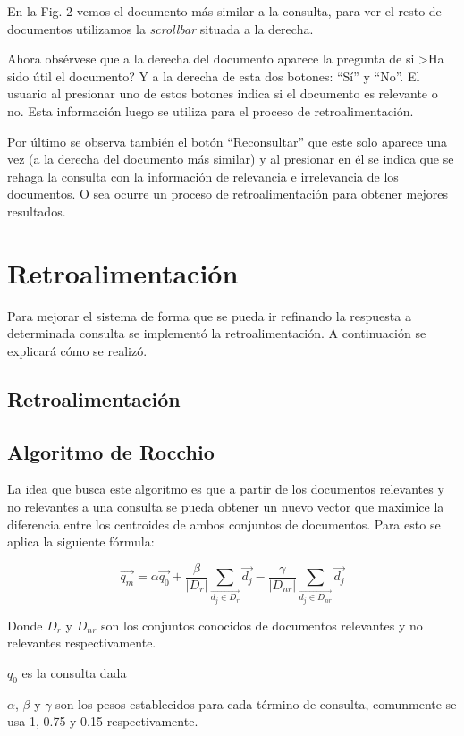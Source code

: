 \documentclass[runningheads]{llncs}
\begin{document}
	En la Fig. 2 vemos el documento m\'as similar a la consulta, para ver el resto de documentos utilizamos la \textit{scrollbar} situada a la derecha.
	
	Ahora obs\'ervese que a la derecha del documento aparece la pregunta de si >Ha sido \'util el documento? Y a la derecha de esta dos botones: ``S\'i'' y ``No''. El usuario al presionar uno de estos botones indica si el documento es relevante o no. Esta informaci\'on luego se utiliza para el proceso de retroalimentaci\'on.
	
	Por \'ultimo se observa tambi\'en el bot\'on ``Reconsultar'' que este solo aparece una vez (a la derecha del documento m\'as similar) y al presionar en \'el se indica que se rehaga la consulta con la informaci\'on de relevancia e irrelevancia de los documentos. O sea ocurre un proceso de retroalimentaci\'on para obtener mejores resultados.
	
	
\section{Retroalimentación}
Para mejorar el sistema de forma que se pueda ir refinando la respuesta a determinada consulta se implementó la retroalimentación. A continuación se explicará cómo se realizó.

\subsection{Retroalimentación}

\subsection{Algoritmo de Rocchio}
La idea que busca este algoritmo es que a partir de los documentos relevantes y no relevantes a una consulta se pueda obtener un nuevo vector que maximice la diferencia entre los centroides de ambos conjuntos de documentos.
Para esto se aplica la siguiente fórmula:

$$
\vec{q_{m}}= \alpha \vec{q_{0}}+\dfrac{\beta}{|D_{r}|}\sum_{\vec{d_{j} \in D_{r}}} \vec{d_{j}} -\dfrac{\gamma}{|D_{nr}|}\sum_{\vec{d_{j} \in D_{nr}}} \vec{d_{j}}
$$

Donde $ D_{r} $ y $D_{nr} $ son los conjuntos conocidos de documentos relevantes y no relevantes respectivamente.

$ q_{0} $ es la consulta dada

$ \alpha$, $\beta $ y  $ \gamma $ son los pesos establecidos para cada t\'ermino de consulta, comunmente se usa 1, 0.75 y 0.15 respectivamente.
\end{document}
